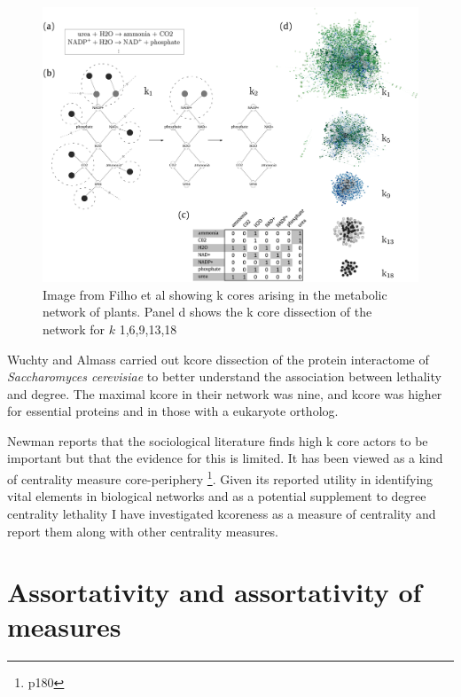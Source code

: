 \begin{figure}
    \centering
    \includegraphics[width=\textwidth]{images/chapter3/from_plos/kcorejournalpone0195843g001.PNG}
    \caption{Image from Filho et al \cite{filho2018hierarchical} showing k cores arising in the metabolic network of plants. Panel d shows the k core dissection of the network for $k$ {1,6,9,13,18}}
    \label{fig:kcore from Filho}
\end{figure}

Wuchty and Almass carried out kcore dissection of the protein interactome of \textit{Saccharomyces cerevisiae} to better understand the association between lethality and degree. The maximal kcore in their network was nine, and kcore was higher for essential proteins and in those with a eukaryote ortholog\cite{wuchty2005peeling}.

Newman reports that the sociological literature finds high k core actors to be important but that the evidence for this is limited\cite{newman2018networks}. It has been viewed as a kind of centrality measure core-periphery \cite{newman2018networks}\footnote{p180}. Given its reported utility in identifying vital elements in biological networks and as a potential supplement to degree centrality lethality\cite{wuchty2005peeling} I have investigated kcoreness as a measure of centrality and report them along with other centrality measures.






\section{Assortativity and assortativity of measures}
\label{sec:assortativity}

